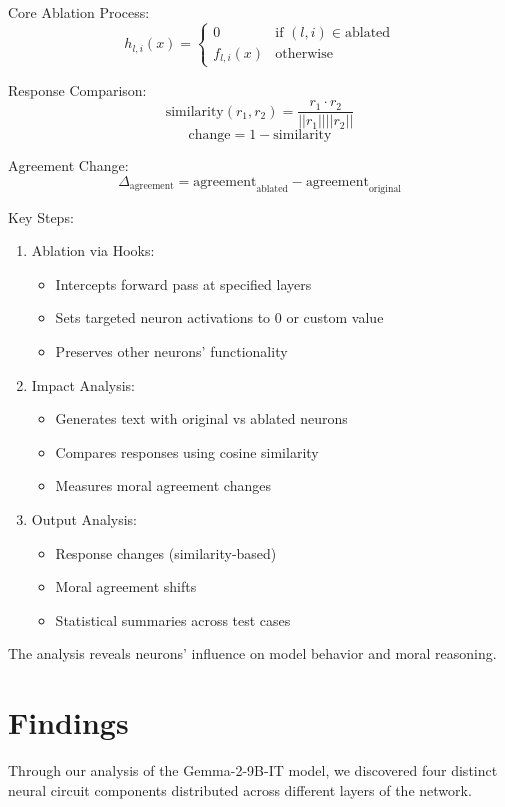 Core Ablation Process:
$$h_{l,i}(x) = \begin{cases} 0 & \text{if } (l,i) \in \text{ablated} \\ f_{l,i}(x) & \text{otherwise} \end{cases}$$

Response Comparison:
$$\text{similarity}(r_1, r_2) = \frac{r_1 \cdot r_2}{||r_1|| ||r_2||}$$
$$\text{change} = 1 - \text{similarity}$$

Agreement Change:
$$\Delta_{\text{agreement}} = \text{agreement}_{\text{ablated}} - \text{agreement}_{\text{original}}$$

Key Steps:

\begin{enumerate}
    \item Ablation via Hooks:
    \begin{itemize}
        \item Intercepts forward pass at specified layers
        \item Sets targeted neuron activations to 0 or custom value
        \item Preserves other neurons' functionality
    \end{itemize}
    \item Impact Analysis:
    \begin{itemize}
        \item Generates text with original vs ablated neurons
        \item Compares responses using cosine similarity
        \item Measures moral agreement changes
    \end{itemize}
    \item Output Analysis:
    \begin{itemize}
        \item Response changes (similarity-based)
        \item Moral agreement shifts
        \item Statistical summaries across test cases
    \end{itemize}
\end{enumerate}
The analysis reveals neurons' influence on model behavior and moral reasoning.

\section*{Findings}

Through our analysis of the Gemma-2-9B-IT model, we discovered four distinct neural circuit components distributed across different layers of the network.

